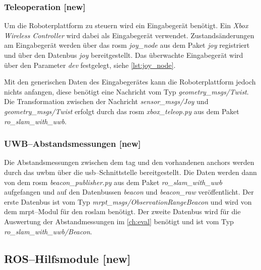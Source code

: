 \subsubsection{Teleoperation [new]}

Um die Roboterplattform zu steuern wird ein Eingabegerät benötigt. Ein \textit{Xbox Wireless Controller} wird dabei als Eingabegerät verwendet. Zustandsänderungen am Eingabegerät werden über das \Gls{rosm} \textit{joy\_node} aus dem Paket \textit{joy} registriert und über den Datenbus \textit{joy} bereitgestellt. Das überwachte Eingabegerät wird über den Parameter \textit{dev} festgelegt, siehe \autoref{lst:joy_node}.

Mit den generischen Daten des Eingabegerätes kann die Roboterplattform jedoch nichts anfangen, diese benötigt eine Nachricht vom Typ \textit{geometry\_msgs/Twist}. Die Transformation zwischen der Nachricht \textit{sensor\_msgs/Joy} und \textit{geometry\_msgs/Twist} erfolgt durch das \Gls{rosm} \textit{xbox\_teleop.py} aus dem Paket \textit{ro\_slam\_with\_uwb}.


\begin{comment}
--------------------------------------------------------------------------------
\end{comment}
\subsubsection{UWB--Abstandsmessungen [new]}

Die Abstandsmessungen zwischen dem \Gls{tag} und den vorhandenen \Glspl{anchor} werden durch das \Gls{uwbm} über die \Gls{usb}--Schnittstelle bereitgestellt. Die Daten werden dann von dem \Gls{rosm} \textit{beacon\_publisher.py} aus dem Paket \textit{ro\_slam\_with\_uwb} aufgefangen und auf den Datenbussen \textit{beacon} und \textit{beacon\_raw} veröffentlicht. Der erste Datenbus ist vom Typ \textit{mrpt\_msgs/ObservationRangeBeacon} und wird von dem \Gls{mrpt}--Modul für den \Gls{roslam} benötigt. Der zweite Datenbus wird für die Auswertung der Abstandmessungen im \autoref{ch:eval} benötigt und ist vom Typ \textit{ro\_slam\_with\_uwb/Beacon}.


\begin{comment}
--------------------------------------------------------------------------------
\end{comment}
\subsection{ROS--Hilfsmodule [new]}


